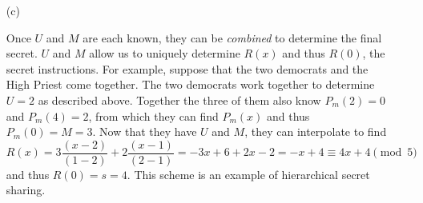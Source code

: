 \documentclass[]{article}
\begin{document}
\begin{qunlist}
{{\begin{enumerate}
The \textit{multi-faction secret} involves creating a degree-1 polynomial $P_m(x)$ and giving one point to all members of each faction. For example, the anarchists can each get $P_m(1)$, the democrats each get $P_m(2)$, the President gets $P_m(3)$, and the High Priest gets $P_m(4)$. In this way if members of any two factions are in agreement, they can reveal $M$ (encoded, for example, as the $y$-intercept of $P_m(x)$). To continue our example, we choose degree-1 polynomial $P_m(x) = x+3$ and tell each anarchist $P_m(1)=4$, each democrat $P_m(2)=5\equiv0 \bmod 5$, the President $P_m(3)=6 \equiv 1 \bmod 5$, and the High Priest $P_m(4) = 7 \equiv 2 \bmod 5$. Now any two members of distinct factions can determine $P_m(x)$ and thus $P_m(0) = M = 3$ by interpolating their two values.

\item[(c)]

Once $U$ and $M$ are each known, they can be \textit{combined} to determine the final secret. $U$ and $M$ allow us to uniquely determine $R(x)$ and thus $R(0)$, the secret instructions. For example, suppose that the two democrats and the High Priest come together. The two democrats work together to determine $U=2$ as described above. Together the three of them also know $P_m(2)=0$ and $P_m(4)=2$, from which they can find $P_m(x)$ and thus $P_m(0) = M=3$. Now that they have $U$ and $M$, they can interpolate to find 
\[ R(x) = 3 \frac{(x-2)}{(1-2)} + 2 \frac{(x-1)}{(2-1)} = -3x+6 + 2x-2 = -x + 4 \equiv 4x + 4 \pmod 5 \]
and thus $R(0) = s = 4$. This scheme is an example of hierarchical secret sharing. 

\end{enumerate}




}}
\end{qunlist}
\end{document}
